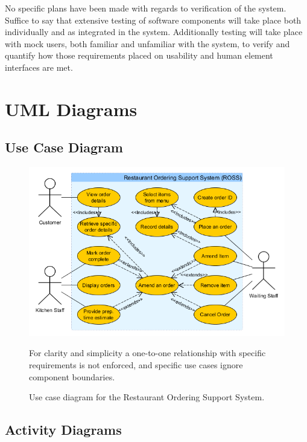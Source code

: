 \documentclass[11pt, a4paper]{report}
\begin{document}
No specific plans have been made with regards to verification of the system. Suffice to say that extensive testing of software components will take place both individually and as integrated in the system. Additionally testing will take place with mock users, both familiar and unfamiliar with the system, to verify and quantify how those requirements placed on usability and human element interfaces are met.


\section{UML Diagrams}

\subsection{Use Case Diagram}

\pagebreak
\begin{figure}
\centering
\includegraphics[scale=1]{Figures/UseCaseDiagram.png}
\caption{Use case diagram for the Restaurant Ordering Support System.}
For clarity and simplicity a one-to-one relationship with specific requirements is not enforced, and specific use cases ignore component boundaries.
\end{figure}


\subsection{Activity Diagrams}
\end{document}
